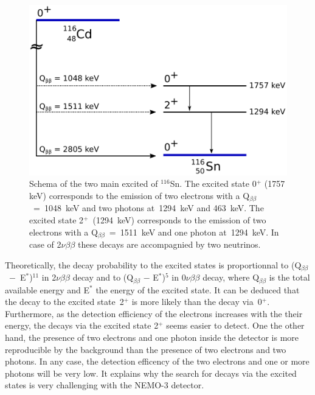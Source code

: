 \documentclass[main.tex]{subfiles}
\begin{document}
\begin{figure} [h!]
\begin{center}
\includegraphics[scale=0.60]{pictures/Chap6/SchemaCdExcitedState.pdf}
\end{center}
\caption{Schema of the two main excited of $^{\text{116}}$Sn. The excited state 0$^+$ (1757 keV) corresponds to the emission of two electrons with a Q$_{\beta\beta}$~=~1048~keV and two photons at~1294~keV and 463~keV. The excited state 2$^+$~(1294~keV) corresponds to the emission of two electrons with a Q$_{\beta\beta}$~=~1511~keV and one photon at~1294~keV. In case of 2$\nu\beta\beta$ these decays are accompagnied by two neutrinos.}
\label{SchemaExcitedState}
\end{figure}



\NI Theoretically, the decay probability to the excited states is proportionnal to (Q$_{\beta\beta}$~$-$~E$^*$)$^{\text{11}}$ in 2$\nu\beta\beta$ decay and to (Q$_{\beta\beta}$ $-$ E$^*$)$^{\text{5}}$ in 0$\nu\beta\beta$ decay, where Q$_{\beta\beta}$ is the total available energy and E$^*$ the energy of the excited state. It can be deduced that the decay to the excited state~2$^+$ is more likely than the decay via~0$^+$. Furthermore, as the detection efficiency of the electrons increases with the their energy, the decays via the excited state 2$^+$ seems easier to detect. One the other hand, the presence of two electrons and one photon inside the detector is more reproducible by the background than the presence of two electrons and two photons. In any case, the detection efficency of the two electrons and one or more photons will be very low. It explains why the search for decays via the excited states is very challenging with the NEMO-3 detector.
\end{document}
